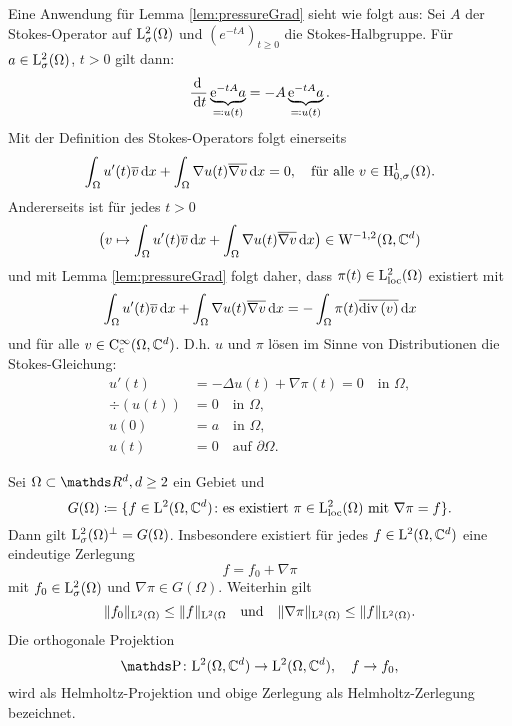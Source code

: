 Eine Anwendung für Lemma \ref{lem:pressureGrad} sieht wie folgt aus:
Sei $A$ der Stokes-Operator auf $\mathrm{L}^2_\sigma(\Omega)$ und $(e^{-tA})_{t \geq 0}$ die Stokes-Halbgruppe.
Für $a \in \mathrm{L}^2_\sigma(\Omega)$, $t > 0$ gilt dann:
$$
\frac{\, {\operatorname{d}\!{\ }}}{\, {\operatorname{d}\!{t}}} \underbrace{\mathrm{e}^{-tA} a}_{\eqqcolon u(t)} = - A \underbrace{\mathrm{e}^{-t A} a}_{\eqqcolon u(t)}.
$$
Mit der Definition des Stokes-Operators folgt einerseits
$$
\int_\Omega u'(t) \overline v \, {\operatorname{d}\!{x}} + \int_\Omega \nabla u(t)  \overline{\nabla v} \, {\operatorname{d}\!{x}}= 0, \quad\text{für alle } v \in \mathrm{H}^1_{0,\sigma}(\Omega).
$$
Andererseits ist für jedes $t > 0$ 
$$
\big( v \mapsto \int_\Omega u'(t) \overline v \, {\operatorname{d}\!{x}} + \int_\Omega \nabla u(t) \overline{\nabla v} \, {\operatorname{d}\!{x}} \big) \in \mathrm{W}^{-1,2}(\Omega, \mathbb{C}^d)
$$
und mit Lemma \ref{lem:pressureGrad} folgt daher, dass $\pi(t) \in \mathrm{L}^2_{\operatorname{loc}}(\Omega)$ existiert mit
$$
\int_\Omega u'(t) \overline v \, {\operatorname{d}\!{x}} + \int_\Omega \nabla u(t) \overline{\nabla v} \, {\operatorname{d}\!{x}} = -\int_\Omega \pi(t) \overline{\mathrm{div\,} (v)} \, {\operatorname{d}\!{x}}
$$
und für alle $v \in \mathrm{C}_{\mathrm{c}}^\infty(\Omega, \mathbb{C}^d)$.
D.h. $u$ und $\pi$ lösen im Sinne von Distributionen die Stokes-Gleichung:
\begin{align*}
  u'(t) &= -\Delta u(t) + \nabla \pi(t) = 0 \quad\text{in } \Omega, \\
  \div(u(t)) &= 0 \quad\text{in } \Omega, \\
  u(0) &= a \quad\text{in }  \Omega, \\
  u(t)  &= 0 \quad\text{auf } \partial\Omega.
\end{align*}

\begin{thm}
  Sei $\Omega \subset \R^d, d \geq 2$ ein Gebiet und
  $$
  G(\Omega) \coloneqq \{ f \in \mathrm{L}^2(\Omega, \mathbb{C}^d) \colon \text{es existiert } \pi \in \mathrm{L}^2_{\operatorname{loc}}(\Omega) \text{ mit } \nabla \pi = f \}.
  $$
  Dann gilt $\mathrm{L}^2_\sigma(\Omega)^\perp = G(\Omega)$.
  Insbesondere existiert für jedes $f \in \mathrm{L}^2(\Omega, \mathbb{C}^d)$ eine eindeutige Zerlegung
  $$
  f = f_0 + \nabla \pi
  $$
  mit $f_0 \in \mathrm{L}^2_\sigma(\Omega)$ und $\nabla\pi \in G(\Omega)$.
  Weiterhin gilt
  $$
  \|f_0\|_{\mathrm{L}^2(\Omega)} \leq \|f\|_{\mathrm{L}^2(\Omega} \quad\text{und}\quad \|\nabla\pi \|_{\mathrm{L}^2(\Omega)} \leq \|f\|_{\mathrm{L}^2(\Omega)}.
  $$
  Die orthogonale Projektion 
  $$
  \PP \colon \Ell^2(\Omega, \C^d) \to \Ell^2(\Omega, \C^d), \quad f \to f_0,
  $$
  wird als Helmholtz-Projektion und obige Zerlegung als Helmholtz-Zerlegung bezeichnet.
\end{thm}

